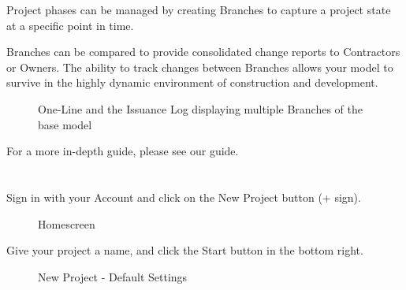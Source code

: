 \documentclass[letterpaper,10pt,english]{sphinxmanual}
\begin{document}
Project phases can be managed by creating Branches to capture a project state at a specific point in time.

Branches can be compared to provide consolidated change reports to Contractors or Owners.  The ability to track changes between Branches allows your model to survive in the highly dynamic environment of construction and development.

\begin{figure}[H]
\centering
\capstart

\noindent{}
\caption{One-Line and the Issuance Log displaying multiple Branches of the base model}\label{\detokenize{docs/productoverview/index-product_overview:id7}}\end{figure}

For a more in-depth guide, please see our {\hyperref[\detokenize{docs/userguide/index-user_guide:user-guide}]{}} guide.


\chapter{}
\label{\detokenize{docs/index:tutorial-project}}

\section{}
\label{\detokenize{docs/tutorial/index-tutorial:creating-a-new-project}}\label{\detokenize{docs/tutorial/index-tutorial:tutorial-project}}\label{\detokenize{docs/tutorial/index-tutorial::doc}}
Sign in with your Account and click on the New Project button (+ sign).

\begin{figure}[H]
\centering
\capstart

\noindent{}
\caption{Homescreen}\label{\detokenize{docs/tutorial/index-tutorial:id2}}\end{figure}

Give your project a name, and click the Start button in the bottom right.

\begin{figure}[H]
\centering
\capstart

\noindent{}
\caption{New Project - Default Settings}\label{\detokenize{docs/tutorial/index-tutorial:id3}}\end{figure}
\end{document}
